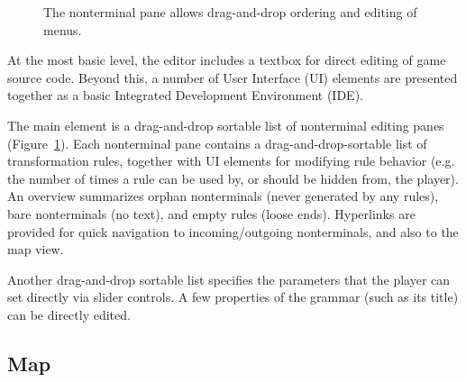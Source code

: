 \documentclass{acm_proc_article-sp}
\begin{document}
\begin{figure}
\caption{
\label{fig:editor}
The nonterminal pane allows drag-and-drop ordering and editing of menus.
}
\end{figure}

At the most basic level, the editor includes a textbox for direct editing of game source code.
Beyond this, a number of User Interface (UI)
elements are presented together as a basic Integrated Development Environment (IDE).

The main element is a drag-and-drop sortable list of nonterminal editing panes (Figure~\ref{fig:editor}).
Each nonterminal pane contains a drag-and-drop-sortable list of transformation rules,
together with UI elements for modifying rule behavior (e.g. the number of times
a rule can be used by, or should be hidden from, the player).
An overview summarizes orphan nonterminals (never generated by any rules),
bare nonterminals (no text), and empty rules (loose ends).
Hyperlinks are provided for quick navigation to incoming/outgoing nonterminals,
and also to the map view.

Another drag-and-drop sortable list specifies the parameters that the player
can set directly via slider controls.
A few properties of the grammar (such as its title) can be directly edited.

\subsection{Map}
\end{document}

